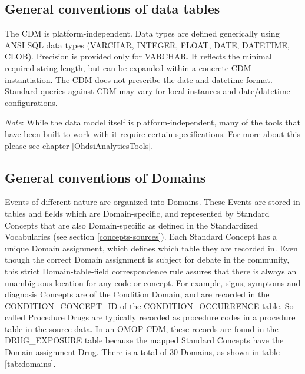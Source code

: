 \documentclass[11pt]{book}
\theoremstyle{definition}
\theoremstyle{definition}
\theoremstyle{definition}
\theoremstyle{remark}
\begin{document}
\hypertarget{general-conventions-of-data-tables}{%
\subsection{General conventions of data tables}\label{general-conventions-of-data-tables}}

The CDM is platform-independent. Data types are defined generically using ANSI SQL data types (VARCHAR, INTEGER, FLOAT, DATE, DATETIME, CLOB). Precision is provided only for VARCHAR. It reflects the minimal required string length, but can be expanded within a concrete CDM instantiation. The CDM does not prescribe the date and datetime format. Standard queries against CDM may vary for local instances and date/datetime configurations.

\emph{Note}: While the data model itself is platform-independent, many of the tools that have been built to work with it require certain specifications. For more about this please see chapter \ref{OhdsiAnalyticsTools}.

\hypertarget{general-conventions-of-domains}{%
\subsection{General conventions of Domains}\label{general-conventions-of-domains}}

Events of different nature are organized into Domains. These Events are stored in tables and fields which are Domain-specific, and represented by Standard Concepts that are also Domain-specific as defined in the Standardized Vocabularies (see section \ref{concepts-sources}). Each Standard Concept has a unique Domain assignment, which defines which table they are recorded in. Even though the correct Domain assignment is subject for debate in the community, this strict Domain-table-field correspondence rule assures that there is always an unambiguous location for any code or concept. For example, signs, symptoms and diagnosis Concepts are of the Condition Domain, and are recorded in the CONDITION\_CONCEPT\_ID of the CONDITION\_OCCURRENCE table. So-called Procedure Drugs are typically recorded as procedure codes in a procedure table in the source data. In an OMOP CDM, these records are found in the DRUG\_EXPOSURE table because the mapped Standard Concepts have the Domain assignment Drug. There is a total of 30 Domains, as shown in table \ref{tab:domains}.
\end{document}
